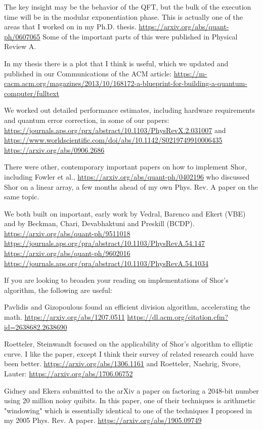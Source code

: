 \documentclass[%
 aip,
 jmp,%
 amsmath,amssymb,
 reprint,%
]{revtex4-1}
\begin{document}
The key insight may be the behavior of the QFT, but the bulk of the
execution time will be in the modular exponentiation phase.  This is
actually one of the areas that I worked on in my Ph.D. thesis.
\url{https://arxiv.org/abs/quant-ph/0607065}
Some of the important parts of this were published in Physical Review
A.

In my thesis there is a plot that I think is useful, which we updated
and published in our Communications of the ACM article:
\url{https://m-cacm.acm.org/magazines/2013/10/168172-a-blueprint-for-building-a-quantum-computer/fulltext}

We worked out detailed performance estimates, including hardware
requirements and quantum error correction, in some of our papers:
\url{https://journals.aps.org/prx/abstract/10.1103/PhysRevX.2.031007}
and
\url{https://www.worldscientific.com/doi/abs/10.1142/S0219749910006435}
\url{https://arxiv.org/abs/0906.2686}

There were other, contemporary important papers on how to implement
Shor, including Fowler et al., \url{https://arxiv.org/abs/quant-ph/0402196}
who discussed Shor on a linear array, a few months ahead of my own
Phys. Rev. A paper on the same topic.

We both built on important, early work by Vedral, Barenco and Ekert
(VBE) and by Beckman, Chari, Devabhaktuni and Preskill (BCDP).
\url{https://arxiv.org/abs/quant-ph/9511018}
\url{https://journals.aps.org/pra/abstract/10.1103/PhysRevA.54.147}
\url{https://arxiv.org/abs/quant-ph/9602016}
\url{https://journals.aps.org/pra/abstract/10.1103/PhysRevA.54.1034}

If you are looking to broaden your reading on implementations of
Shor’s algorithm, the following are useful:

Pavlidis and Gizopoulous found an efficient division algorithm,
accelerating the math.
\url{https://arxiv.org/abs/1207.0511}
\url{https://dl.acm.org/citation.cfm?id=2638682.2638690}

Roetteler, Steinwandt focused on the applicability of Shor's algorithm
to elliptic curve. I like the paper, except I think their survey of
related research could have been better.
\url{https://arxiv.org/abs/1306.1161}
and Roetteler, Naehrig, Svore, Lauter:
\url{https://arxiv.org/abs/1706.06752}

Gidney and Ekera submitted to the arXiv a paper on factoring a
2048-bit number using 20 million noisy quibits.  In this paper, one of
their techniques is arithmetic "windowing" which is essentially
identical to one of the techniques I proposed in my 2005 Phys. Rev. A
paper.  \url{https://arxiv.org/abs/1905.09749}
\end{document}
